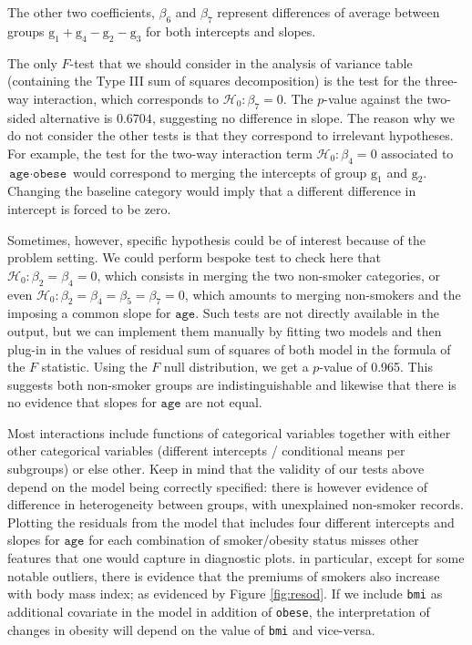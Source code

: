 \documentclass[
  11pt,
  letterpaper,
]{book}
\theoremstyle{definition}
\theoremstyle{definition}
\theoremstyle{definition}
\theoremstyle{definition}
\theoremstyle{remark}
\begin{document}
The other two coefficients, \(\beta_6\) and \(\beta_7\) represent differences of average between groups \(\mathrm{g}_1 + \mathrm{g}_4 - \mathrm{g}_2 - \mathrm{g}_3\) for both intercepts and slopes.

The only \(F\)-test that we should consider in the analysis of variance table (containing the Type III sum of squares decomposition) is the test for the three-way interaction, which corresponds to \(\mathscr{H}_0: \beta_7=0\). The \(p\)-value against the two-sided alternative is \(0.6704\), suggesting no difference in slope. The reason why we do not consider the other tests is that they correspond to irrelevant hypotheses. For example, the test for the two-way interaction term \(\mathscr{H}_0: \beta_4=0\) associated to \(\texttt{age} \cdot \texttt{obese}\) would correspond to merging the intercepts of group \(\mathrm{g}_1\) and \(\mathrm{g}_2\). Changing the baseline category would imply that a different difference in intercept is forced to be zero.

Sometimes, however, specific hypothesis could be of interest because of the problem setting. We could perform bespoke test to check here that \(\mathscr{H}_0: \beta_2=\beta_4=0\), which consists in merging the two non-smoker categories, or even \(\mathscr{H}_0: \beta_2=\beta_4= \beta_5=\beta_7=0\), which amounts to merging non-smokers and the imposing a common slope for \(\texttt{age}\). Such tests are not directly available in the output, but we can implement them manually by fitting two models and then plug-in in the values of residual sum of squares of both model in the formula of the \(F\) statistic. Using the \(F\) null distribution, we get a \(p\)-value of 0.965. This suggests both non-smoker groups are indistinguishable and likewise that there is no evidence that slopes for \(\texttt{age}\) are not equal.

Most interactions include functions of categorical variables together with either other categorical variables (different intercepts / conditional means per subgroups) or else other. Keep in mind that the validity of our tests above depend on the model being correctly specified: there is however evidence of difference in heterogeneity between groups, with unexplained non-smoker records. Plotting the residuals from the model that includes four different intercepts and slopes for \(\texttt{age}\) for each combination of smoker/obesity status misses other features that one would capture in diagnostic plots. in particular, except for some notable outliers, there is evidence that the premiums of smokers also increase with body mass index; as evidenced by Figure \ref{fig:resod}. If we include \texttt{bmi} as additional covariate in the model in addition of \texttt{obese}, the interpretation of changes in obesity will depend on the value of \texttt{bmi} and vice-versa.
\end{document}
